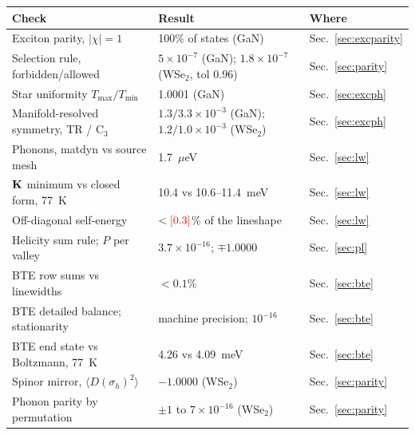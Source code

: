 \begin{table}[h]
\centering\small
\begin{tabular}{p{6.2cm}p{4.6cm}p{5.4cm}}
\toprule
Check & Result & Where\\
\midrule
Exciton parity, $|\chi|=1$ & 100\% of states (GaN) & Sec.~\ref{sec:excparity}\\
Selection rule, forbidden/allowed & $5\times10^{-7}$ (GaN); $1.8\times10^{-7}$ (WSe$_2$, tol 0.96) & Sec.~\ref{sec:parity}\\
Star uniformity $T_{\max}/T_{\min}$ & 1.0001 (GaN) & Sec.~\ref{sec:excph}\\
Manifold-resolved symmetry, TR / C$_3$ & $1.3/3.3\times10^{-3}$ (GaN); $1.2/1.0\times10^{-3}$ (WSe$_2$) & Sec.~\ref{sec:excph}\\
Phonons, matdyn vs source mesh & 1.7~$\mu$eV & Sec.~\ref{sec:lw}\\
$\mathbf{K}$ minimum vs closed form, 77~K & 10.4 vs 10.6--11.4~meV & Sec.~\ref{sec:lw}\\
Off-diagonal self-energy & $<\textcolor{red}{[0.3]}$\% of the lineshape & Sec.~\ref{sec:lw}\\
Helicity sum rule; $P$ per valley & $3.7\times10^{-16}$; $\mp1.0000$ & Sec.~\ref{sec:pl}\\
BTE row sums vs linewidths & $<0.1$\% & Sec.~\ref{sec:bte}\\
BTE detailed balance; stationarity & machine precision; $10^{-16}$ & Sec.~\ref{sec:bte}\\
BTE end state vs Boltzmann, 77~K & 4.26 vs 4.09~meV & Sec.~\ref{sec:bte}\\
Spinor mirror, $\langle D(\sigma_h)^2\rangle$ & $-1.0000$ (WSe$_2$) & Sec.~\ref{sec:parity}\\
Phonon parity by permutation & $\pm1$ to $7\times10^{-16}$ (WSe$_2$) & Sec.~\ref{sec:parity}\\
\bottomrule
\end{tabular}
\end{table}

\clearpage
{}
{}


